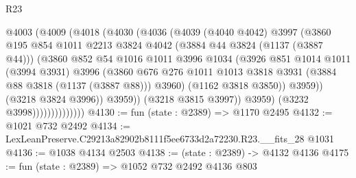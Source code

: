 \begin{lexlean}{R23}
\begin{coremodule}
                            @4003
                              (@4009
                                (@4018
                                  (@4030
                                    (@4036
                                      (@4039
                                        (@4040 @4042)
                                        @3997
                                        (@3860
                                          @195
                                          @854
                                          @1011
                                          @2213
                                          @3824
                                          @4042
                                          (@3884 @44 @3824 (@1137 (@3887 @44)))
                                          (@3860
                                            @852
                                            @54
                                            @1016
                                            @1011
                                            @3996
                                            @1034
                                            (@3926
                                              @851
                                              @1014
                                              @1011
                                              (@3994 @3931)
                                              @3996
                                              (@3860
                                                @676
                                                @276
                                                @1011
                                                @1013
                                                @3818
                                                @3931
                                                (@3884 @88 @3818 (@1137 (@3887 @88)))
                                                @3960)
                                              (@1162 @3818 @3850))
                                            @3959))
                                        (@3218 @3824 @3996))
                                      @3959))
                                  (@3218 @3815 @3997))
                                @3959)
                              (@3232 @3998))))))))))))))
@4130 := fun (state : @2389) => @1170 @2495
@4132 := @1021 @732 @2492
@4134 := LexLeanPreserve.C29213a82902b8111f5ee6733d2a72230.R23.__fits_28 @1031
@4136 := @1038 @4134 @2503
@4138 := (state : @2389) -> @4132 @4136
@4175 := fun (state : @2389) =>
  @1052
    @732
    @2492
    @4136
    @803

\end{coremodule}
\end{lexlean}
